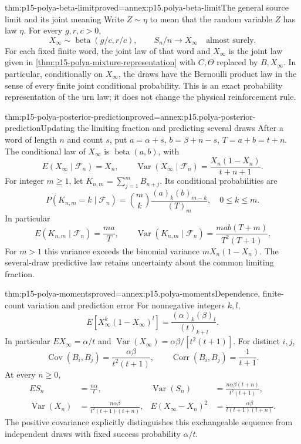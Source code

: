 \begin{hbtheorem}{thm:p15-polya-beta-limit}{proved=annex:p15.polya-beta-limit}{The general source limit and its joint meaning}
Write \(Z\sim\eta\) to mean that the random variable \(Z\) has law \(\eta\).
For every \(g,r,c>0\),
\[
       X_\infty\sim\operatorname{beta}(g/c,r/c),\qquad
       S_n/n\longrightarrow X_\infty\quad\text{almost surely}.
\]
For each fixed finite word, the joint law of that word and \(X_\infty\)
is the joint law given in \cref{thm:p15-polya-mixture-representation}
with \(C,\Theta\) replaced by \(B,X_\infty\).
In particular, conditionally on \(X_\infty\), the draws have the
Bernoulli product law in the sense of every finite joint conditional
probability. This is an exact probability representation of the urn
law; it does not change the physical reinforcement rule.
\end{hbtheorem}

\begin{hbtheorem}{thm:p15-polya-posterior-prediction}{proved=annex:p15.polya-posterior-prediction}{Updating the limiting fraction and predicting several draws}
After a word of length \(n\) and count \(s\), put
\(a=\alpha+s\), \(b=\beta+n-s\), \(T=a+b=t+n\).
The conditional law of \(X_\infty\) is
\(\operatorname{beta}(a,b)\), with
\[
 E(X_\infty\mid\mathcal F_n)=X_n,\qquad
 \operatorname{Var}(X_\infty\mid\mathcal F_n)
          =\frac{X_n(1-X_n)}{t+n+1}.
\]
For integer \(m\geq1\), let \(K_{n,m}=\sum_{j=1}^mB_{n+j}\).
Its conditional probabilities are
\[
 P(K_{n,m}=k\mid\mathcal F_n)
       =\binom mk\frac{(a)_k(b)_{m-k}}{(T)_m},
                    \quad 0\leq k\leq m.
\]
In particular
\[
 E(K_{n,m}\mid\mathcal F_n)=\frac{ma}{T},\qquad
 \operatorname{Var}(K_{n,m}\mid\mathcal F_n)
       =\frac{mab(T+m)}{T^2(T+1)}.
\]
For \(m>1\) this variance exceeds the binomial variance
\(mX_n(1-X_n)\). The several-draw predictive law retains uncertainty
about the common limiting fraction.
\end{hbtheorem}

\begin{hbtheorem}{thm:p15-polya-moments}{proved=annex:p15.polya-moments}{Dependence, finite-count variation and prediction error}
For nonnegative integers \(k,l\),
\[
 E[X_\infty^k(1-X_\infty)^l]
            =\frac{(\alpha)_k(\beta)_l}{(t)_{k+l}}.
\]
In particular \(EX_\infty=\alpha/t\) and
\(\operatorname{Var}(X_\infty)=\alpha\beta/[t^2(t+1)]\).
For distinct \(i,j\),
\[
 \operatorname{Cov}(B_i,B_j)=\frac{\alpha\beta}{t^2(t+1)},
 \qquad \operatorname{Corr}(B_i,B_j)=\frac1{t+1}.
\]
At every \(n\geq0\),
\[
 \begin{aligned}
 ES_n&=\frac{n\alpha}{t},&
 \operatorname{Var}(S_n)&=\frac{n\alpha\beta(t+n)}{t^2(t+1)},\\
 \operatorname{Var}(X_n)&=\frac{n\alpha\beta}{t^2(t+1)(t+n)},&
 E(X_\infty-X_n)^2&=\frac{\alpha\beta}{t(t+1)(t+n)}.
 \end{aligned}
\]
The positive covariance explicitly distinguishes this exchangeable
sequence from independent draws with fixed success probability \(\alpha/t\).
\end{hbtheorem}

